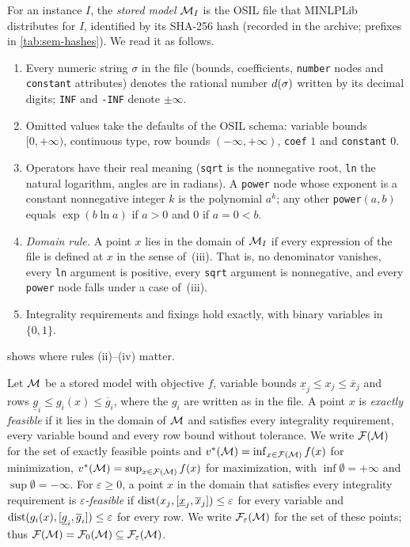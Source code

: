 \begin{definition}\label{def:sem-model}
For an instance $I$, the \emph{stored model} $\mathcal{M}_I$ is the OSIL file that MINLPLib distributes for $I$, identified by its SHA-256 hash (recorded in the archive; prefixes in \cref{tab:sem-hashes}).
We read it as follows.
\begin{enumerate}\setlength{\itemsep}{0pt}\setlength{\parsep}{0pt}
\item[(i)] Every numeric string $\sigma$ in the file (bounds, coefficients, \texttt{number} nodes and \texttt{constant} attributes) denotes the rational number $d(\sigma)$ written by its decimal digits; \texttt{INF} and \texttt{-INF} denote $\pm\infty$.
\item[(ii)] Omitted values take the defaults of the OSIL schema: variable bounds $[0,+\infty)$, continuous type, row bounds $(-\infty,+\infty)$, \texttt{coef} $1$ and \texttt{constant} $0$.
\item[(iii)] Operators have their real meaning (\texttt{sqrt} is the nonnegative root, \texttt{ln} the natural logarithm, angles are in radians).
A \texttt{power} node whose exponent is a constant nonnegative integer $k$ is the polynomial $a^k$; any other \texttt{power}$(a,b)$ equals $\exp(b\ln a)$ if $a>0$ and $0$ if $a=0<b$.
\item[(iv)] \emph{Domain rule.} A point $x$ lies in the domain of $\mathcal{M}_I$ if every expression of the file is defined at $x$ in the sense of~(iii).
That is, no denominator vanishes, every \texttt{ln} argument is positive, every \texttt{sqrt} argument is nonnegative, and every \texttt{power} node falls under a case of~(iii).
\item[(v)] Integrality requirements and fixings hold exactly, with binary variables in $\{0,1\}$.
\end{enumerate}
\end{definition}

 shows where rules (ii)--(iv) matter.

\begin{definition}\label{def:sem-feasible}
Let $\mathcal{M}$ be a stored model with objective $f$, variable bounds $\underline{x}_j\le x_j\le\overline{x}_j$ and rows $\underline{g}_i\le g_i(x)\le\overline{g}_i$, where the $g_i$ are written as in the file.
A point $x$ is \emph{exactly feasible} if it lies in the domain of $\mathcal{M}$ and satisfies every integrality requirement, every variable bound and every row bound without tolerance.
We write $\mathcal{F}(\mathcal{M})$ for the set of exactly feasible points and $v^{*}(\mathcal{M})=\inf_{x\in\mathcal{F}(\mathcal{M})}f(x)$ for minimization, $v^{*}(\mathcal{M})=\sup_{x\in\mathcal{F}(\mathcal{M})}f(x)$ for maximization, with $\inf\emptyset=+\infty$ and $\sup\emptyset=-\infty$.
For $\varepsilon\ge0$, a point $x$ in the domain that satisfies every integrality requirement is \emph{$\varepsilon$-feasible} if $\operatorname{dist}(x_j,[\underline{x}_j,\overline{x}_j])\le\varepsilon$ for every variable and $\operatorname{dist}(g_i(x),[\underline{g}_i,\overline{g}_i])\le\varepsilon$ for every row.
We write $\mathcal{F}_\varepsilon(\mathcal{M})$ for the set of these points; thus $\mathcal{F}(\mathcal{M})=\mathcal{F}_0(\mathcal{M})\subseteq\mathcal{F}_\varepsilon(\mathcal{M})$.
\end{definition}

